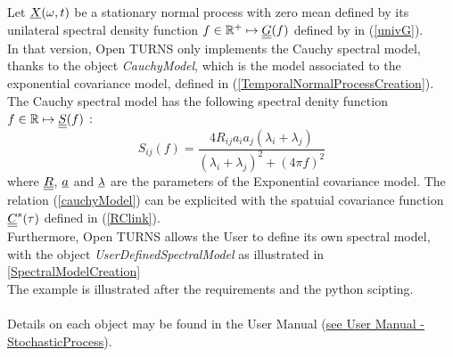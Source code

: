 \renewcommand{\filename}{docUC_StocProc_SpectralNormalProcess_Creation.tex}
\renewcommand{\filetitle}{UC : Creation of a  stationary  normal process from its spectral density function}

\HeaderIIILevel

\label{SpectralNormalProcessCreation}

Let ${\underline{X}}(\omega,t)$ be a stationary normal process with zero mean defined  by  its unilateral spectral density function $f \in \mathbb{R}^+ \mapsto {\underline{\underline{G}}}(f)$ defined by in (\ref{univG}). \\


In that version, Open TURNS only implements the Cauchy spectral model, thanks to the object {\itshape CauchyModel}, which is the model associated to the exponential covariance model, defined in (\ref{TemporalNormalProcessCreation}). The Cauchy spectral model has the following spectral denity function $f \in \mathbb{R} \mapsto {\underline{\underline{S}}}(f)$ : 
\begin{equation}\label{cauchyModel}
  S_{ij}(f) = \displaystyle \frac{4R_{ij}a_ia_j(\lambda_i+ \lambda_j)}{(\lambda_i+ \lambda_j)^2 + (4\pi f)^2}
\end{equation}
where ${\underline{\underline{R}}}$, ${\underline{a}}$ and ${\underline{\lambda}}$ are the parameters of the Exponential covariance model. The relation (\ref{cauchyModel}) can be explicited with the spatuial covariance function  ${\underline{\underline{C}}}^{s}(\tau)$ defined in (\ref{RClink}).\\
 

Furthermore, Open TURNS allows the User to define its own spectral model, with the object {\itshape UserDefinedSpectralModel} as illustrated in \ref{SpectralModelCreation}\\


The example is illustrated after the requirements and the python scipting. \\ \\
Details on each object may be found in the User Manual  (\href{OpenTURNS_UserManual_TUI.pdf}{see User Manual - StochasticProcess}).\\


